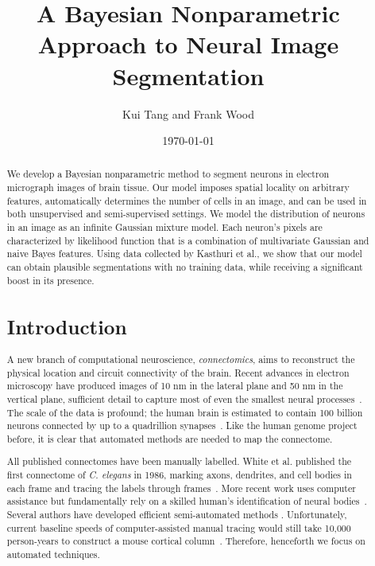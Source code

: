 \documentclass[draft,english]{article}
\newcommand{\+}[1]{\ensuremath{\boldsymbol{\mathrm{#1}}}}
\begin{document}
\listoffixmes

\title{A Bayesian Nonparametric Approach to Neural Image Segmentation}
\author{Kui Tang and Frank Wood}
\date{\today}
\maketitle
\begin{abstract}
We develop a Bayesian nonparametric method to segment neurons in electron micrograph images of brain tissue. Our model imposes spatial locality on arbitrary features, automatically determines the number of cells in an image, and can be used in both unsupervised and semi-supervised settings. We model the distribution of neurons in an image as an infinite Gaussian mixture model. Each neuron's pixels are characterized by likelihood function that is a combination of multivariate Gaussian and naive Bayes features. Using data collected by Kasthuri et al., we show that our model can obtain plausible segmentations with no training data, while receiving a significant boost in its presence.

\section{Introduction}
A new branch of computational neuroscience, \emph{connectomics}, aims to reconstruct the physical location and circuit connectivity of the brain. Recent advances in electron microscopy have produced images of 10 nm in the lateral plane and 50 nm in the vertical plane, sufficient detail to capture most of even the smallest neural processes~\cite{Briggman2006}. The scale of the data is profound; the human brain is estimated to contain 100 billion neurons connected by up to a quadrillion synapses~\cite{Kasthuri2010}. Like the human genome project before, it is clear that automated methods are needed to map the connectome.

All published connectomes have been manually labelled. White et al. published the first connectome of \emph{C. elegans} in 1986, marking axons, dendrites, and cell bodies in each frame and tracing the labels through frames~\cite{White12111986}. More recent work uses computer assistance but fundamentally rely on a skilled human's identification of neural bodies~\cite{Jarrell2012,Bock2011Roberts2011}. Several authors have developed efficient semi-automated methods \cite{Roberts2011,Unger2009}. Unfortunately, current baseline speeds of computer-assisted manual tracing would still take 10,000 person-years to construct a mouse cortical column~\cite{Briggman2006}. Therefore, henceforth we focus on automated techniques.


\end{abstract}
\end{document}
